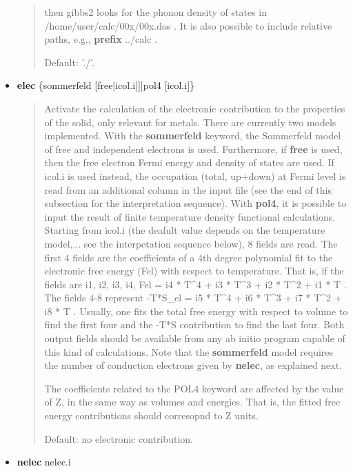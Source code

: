 \documentclass[a4paper]{article}
\begin{document}
\begin{itemize}
\begin{quote}
then gibbs2 looks for the phonon density of states in
/home/user/calc/00x/00x.dos . It is also possible to include
relative paths, e.g., \textbf{prefix} ../calc .

Default: './'.

\end{quote}

\item \textbf{elec} \{sommerfeld {[}free|icol.i|{]}|pol4 {[}icol.i{]}\}
%
\begin{quote}

Activate the calculation of the electronic contribution to the
properties of the solid, only relevant for metals. There are
currently two models implemented. With the \textbf{sommerfeld} keyword,
the Sommerfeld model of free and independent electrons is
used. Furthermore, if \textbf{free} is used, then the free electron
Fermi energy and density of states are used. If icol.i is used
instead, the occupation (total, up+down) at Fermi level is read
from an additional column in the input file (see the end of this
subsection for the interpretation sequence). With \textbf{pol4}, it is
possible to input the result of finite temperature density
functional calculations. Starting from icol.i (the deafult value
depends on the temperature model,... see the interpetation sequence
below), 8 fields are read. The first 4 fields are the coefficients
of a 4th degree polynomial fit to the electronic free energy (Fel)
with respect to temperature. That is, if the fields are i1, i2, i3,
i4, Fel = i4 * T\textasciicircum{}4 + i3 * T\textasciicircum{}3 + i2 * T\textasciicircum{}2 + i1 * T . The fields 4-8
represent -T*S\_el = i5 * T\textasciicircum{}4 + i6 * T\textasciicircum{}3 + i7 * T\textasciicircum{}2 + i8 * T
. Usually, one fits the total free energy with respect to volume to
find the first four and the -T*S contribution to find the
last four. Both output fields should be available from any ab initio
program capable of this kind of calculations. Note that the
\textbf{sommerfeld} model requires the number of conduction electrons
given by \textbf{nelec}, as explained next.

The coefficients related to the POL4 keyword are affected by the
value of Z, in the same way as volumes and energies. That is, the
fitted free energy contributions should corresopnd to Z units.

Default: no electronic contribution.

\end{quote}

\item \textbf{nelec} nelec.i
%
\begin{quote}


\end{quote}
\end{itemize}
\end{document}
